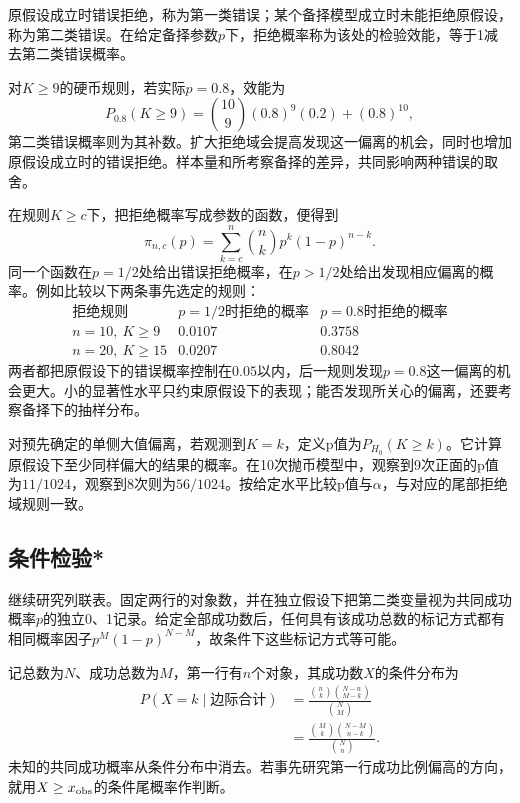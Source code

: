 原假设成立时错误拒绝，称为{\heiti 第一类错误}；某个备择模型成立时未能拒绝原假设，称为{\heiti 第二类错误}。在给定备择参数\(p\)下，拒绝概率称为该处的{\heiti 检验效能}，等于1减去第二类错误概率。

对\(K\ge9\)的硬币规则，若实际\(p=0.8\)，效能为
\[
 P_{0.8}(K\ge9)=\binom{10}9(0.8)^9(0.2)+(0.8)^{10},
\]
第二类错误概率则为其补数。扩大拒绝域会提高发现这一偏离的机会，同时也增加原假设成立时的错误拒绝。样本量和所考察备择的差异，共同影响两种错误的取舍。

在规则\(K\ge c\)下，把拒绝概率写成参数的函数，便得到
\[
 \pi_{n,c}(p)=\sum_{k=c}^n\binom nkp^k(1-p)^{n-k}.
\]
同一个函数在\(p=1/2\)处给出错误拒绝概率，在\(p>1/2\)处给出发现相应偏离的概率。例如比较以下两条事先选定的规则：
\[
 \begin{array}{c|cc}
 \text{拒绝规则}&p=1/2\text{时拒绝的概率}&p=0.8\text{时拒绝的概率}\\\hline
 n=10,\ K\ge9&0.0107&0.3758\\
 n=20,\ K\ge15&0.0207&0.8042
 \end{array}
\]
两者都把原假设下的错误概率控制在\(0.05\)以内，后一规则发现\(p=0.8\)这一偏离的机会更大。小的显著性水平只约束原假设下的表现；能否发现所关心的偏离，还要考察备择下的抽样分布。

对预先确定的单侧大值偏离，若观测到\(K=k\)，定义{\heiti p值}为\(P_{H_0}(K\ge k)\)。它计算原假设下至少同样偏大的结果的概率。在10次抛币模型中，观察到9次正面的p值为\(11/1024\)，观察到8次则为\(56/1024\)。按给定水平比较p值与\(\alpha\)，与对应的尾部拒绝域规则一致。

\subsection{条件检验*}

继续研究列联表。固定两行的对象数，并在独立假设下把第二类变量视为共同成功概率\(p\)的独立0、1记录。给定全部成功数后，任何具有该成功总数的标记方式都有相同概率因子\(p^M(1-p)^{N-M}\)，故条件下这些标记方式等可能。

记总数为\(N\)、成功总数为\(M\)，第一行有\(n\)个对象，其成功数\(X\)的条件分布为
\begin{equation}\label{eq:prob-fisher-conditional}
 \begin{aligned}
 P(X=k\mid\text{边际合计})
 &=\frac{\binom nk\binom{N-n}{M-k}}{\binom NM}\\
 &=\frac{\binom Mk\binom{N-M}{n-k}}{\binom Nn}.
 \end{aligned}
\end{equation}
未知的共同成功概率从条件分布中消去。若事先研究第一行成功比例偏高的方向，就用\(X\ge x_{\rm obs}\)的条件尾概率作判断。

